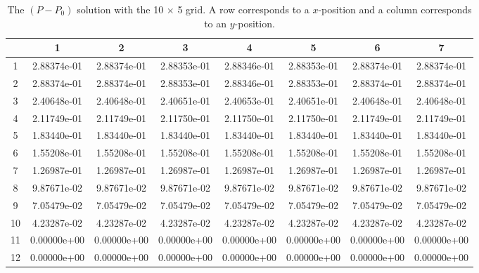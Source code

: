 \documentclass{article}
\begin{document}
\def\arraystretch{1.3}
\begin{table}[H]
	\scriptsize
	\centering
	\caption{The $(P - P_0)$ solution with the 10 $\times$ 5 grid. A row corresponds to a $x$-position and a column corresponds to an $y$-position.}
	\vspace{0.2cm}
	\begin{tabular}{c|S|S|S|S|S|S|S}
		& {1} & {2} & {3} & {4} & {5} & {6} & {7} \\
		 & 2.88374e-01 & 2.88374e-01 & 2.88353e-01 & 2.88346e-01 & 2.88353e-01 & 2.88374e-01 & 2.88374e-01 \\
		2 & 2.88374e-01 & 2.88374e-01 & 2.88353e-01 & 2.88346e-01 & 2.88353e-01 & 2.88374e-01 & 2.88374e-01 \\
		3 & 2.40648e-01 & 2.40648e-01 & 2.40651e-01 & 2.40653e-01 & 2.40651e-01 & 2.40648e-01 & 2.40648e-01 \\
		4 & 2.11749e-01 & 2.11749e-01 & 2.11750e-01 & 2.11750e-01 & 2.11750e-01 & 2.11749e-01 & 2.11749e-01 \\
		5 & 1.83440e-01 & 1.83440e-01 & 1.83440e-01 & 1.83440e-01 & 1.83440e-01 & 1.83440e-01 & 1.83440e-01 \\
		6 & 1.55208e-01 & 1.55208e-01 & 1.55208e-01 & 1.55208e-01 & 1.55208e-01 & 1.55208e-01 & 1.55208e-01 \\
		7 & 1.26987e-01 & 1.26987e-01 & 1.26987e-01 & 1.26987e-01 & 1.26987e-01 & 1.26987e-01 & 1.26987e-01 \\
		8 & 9.87671e-02 & 9.87671e-02 & 9.87671e-02 & 9.87671e-02 & 9.87671e-02 & 9.87671e-02 & 9.87671e-02 \\
		9 & 7.05479e-02 & 7.05479e-02 & 7.05479e-02 & 7.05479e-02 & 7.05479e-02 & 7.05479e-02 & 7.05479e-02 \\
		10 & 4.23287e-02 & 4.23287e-02 & 4.23287e-02 & 4.23287e-02 & 4.23287e-02 & 4.23287e-02 & 4.23287e-02 \\
		11 & 0.00000e+00 & 0.00000e+00 & 0.00000e+00 & 0.00000e+00 & 0.00000e+00 & 0.00000e+00 & 0.00000e+00 \\
		12 & 0.00000e+00 & 0.00000e+00 & 0.00000e+00 & 0.00000e+00 & 0.00000e+00 & 0.00000e+00 & 0.00000e+00 \\
	\end{tabular}
	\label{table:coarse-p-p0}
\end{table}
\end{document}
